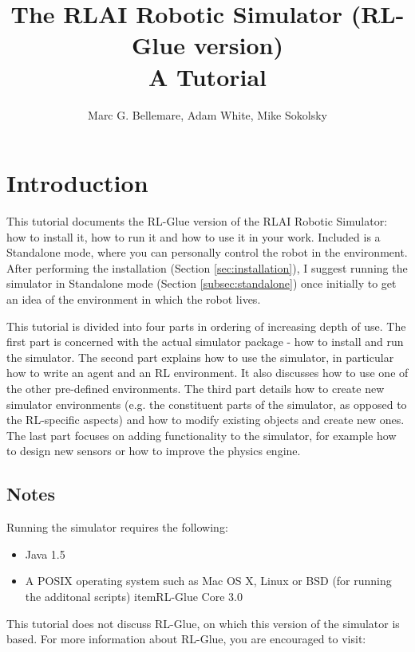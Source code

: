 \documentclass[12pt]{article}
\author{Marc G. Bellemare, Adam White, Mike Sokolsky}
\title{The RLAI Robotic Simulator (RL-Glue version)\\ A Tutorial}
\begin{document}
\maketitle

\tableofcontents

\section{Introduction}

This tutorial documents the RL-Glue version of the RLAI Robotic Simulator: how 
to install it, how to run it and how to use it in your work. Included is a 
Standalone mode, where you can personally control the robot in the environment.
After performing the installation (Section \ref{sec:installation}),  I suggest 
running the simulator in Standalone mode (Section \ref{subsec:standalone}) 
once initially to get an idea of the environment in which the robot lives.

This tutorial is divided into four parts in ordering of increasing depth of
use. The first part is concerned with the actual simulator package - how
to install and run the simulator. The second part explains how to use the 
simulator, in particular how to write an agent and an RL environment. It
also discusses how to use one of the other pre-defined environments. The
third part details how to create new simulator environments (e.g. the 
constituent parts of the simulator, as opposed to the RL-specific aspects)
and how to modify existing objects and create new ones. The last part focuses
on adding functionality to the simulator, for example how to design new 
sensors or how to improve the physics engine.

\subsection{Notes}

Running the simulator requires the following:

\begin{itemize}
\item{Java 1.5}
\item{A POSIX operating system such as Mac OS X, Linux or BSD (for running the additonal scripts)}
item{RL-Glue Core 3.0}
\end{itemize}

This tutorial does not discuss RL-Glue, on which this version of the simulator
is based. For more information about RL-Glue, you are encouraged to visit:
\end{document}
